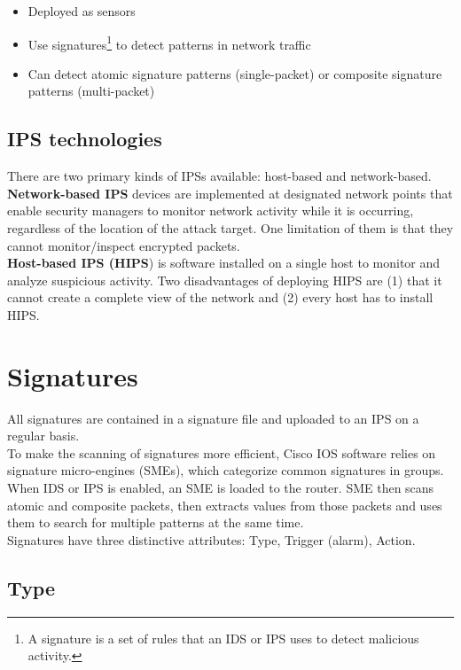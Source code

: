 \begin{itemize}
\item Deployed as sensors
\item Use signatures\footnote{A signature is a set of rules that an IDS or IPS uses to detect malicious activity.} to detect patterns in network traffic
\item Can detect atomic signature patterns (single-packet) or composite signature patterns (multi-packet)
\end{itemize}

\subsection{IPS technologies}

There are two primary kinds of IPSs available: host-based and network-based. \\

\textbf{Network-based IPS} devices are implemented at designated network points that enable security managers to monitor network activity while it is occurring, regardless of the location of the attack target. One limitation of them is that they cannot monitor/inspect encrypted packets.\\

\textbf{Host-based IPS (HIPS}) is software installed on a single host to monitor and analyze suspicious activity. Two disadvantages of deploying HIPS are (1) that it cannot create a complete view of the network and (2) every host has to install HIPS.

\section{Signatures}

All signatures are contained in a signature file and uploaded to an IPS on a regular basis. \\

To make the scanning of signatures more efficient, Cisco IOS software relies on signature micro-engines (SMEs), which categorize common signatures in groups. When IDS or IPS is enabled, an SME is loaded to the router. SME then scans atomic and composite packets, then extracts values from those packets and uses them to search for multiple patterns at the same time.\\

Signatures have three distinctive attributes: Type, Trigger (alarm), Action.

\subsection{Type}

